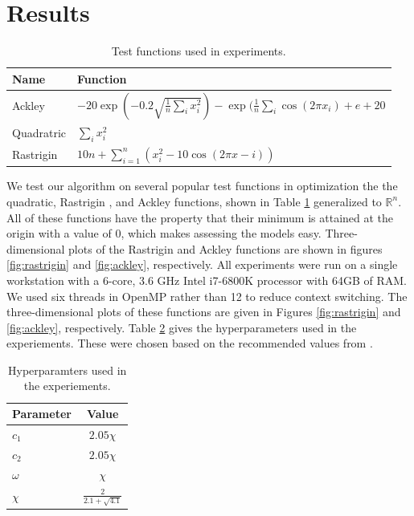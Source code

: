 \section{Results}\label{sec:results}
\begin{table}
  \centering
  \caption{Test functions used in experiments.}\label{tab:functions}
  \begin{tabular}{ll}\toprule
    \textbf{Name} & \textbf{Function}\\\midrule
    Ackley & $-20\exp(-0.2\sqrt{\frac{1}{n}\sum_ix_i^2}) -
             \exp(\frac{1}{n}\sum_i\cos(2\pi x_i) + e + 20$\\
    Quadratric & $\sum_i x_i^2$\\
    Rastrigin & $10n + \sum_{i=1}^n(x_i^2 - 10\cos(2\pi x - i))$\\\bottomrule
  \end{tabular}
\end{table}
We test our algorithm on several popular test functions in optimization
\cite{testprobs} the the quadratic, Rastrigin
\cite{rastrigin}, and Ackley \cite{ackley} functions, shown in Table
\ref{tab:functions} generalized to $\mathbb{R}^n$. All of these functions have
the property that their minimum is attained at the origin with a value of
$0$, which makes assessing the models easy. Three-dimensional plots of the
Rastrigin and Ackley functions are shown in figures \ref{fig:rastrigin} and
\ref{fig:ackley}, respectively.
All experiments were run on a single
workstation with a 6-core, 3.6 GHz Intel i7-6800K processor with 64GB of RAM. We
used six threads in OpenMP rather than 12 to reduce context switching.
The three-dimensional plots of these functions are given in Figures
\ref{fig:rastrigin} and \ref{fig:ackley}, respectively. Table \ref{tab:param}
gives the hyperparameters used in the experiements. These were chosen based on
the recommended values from \cite{spso}.

\begin{table}
  \centering
  \caption{Hyperparamters used in the experiements.}\label{tab:param}
  \begin{tabular}{lc}\toprule
    \textbf{Parameter} & \textbf{Value}\\\midrule
    $c_1$ & $2.05 \chi$\\
    $c_2$ & $2.05 \chi$\\
    $\omega$ & $\chi$\\
    $\chi$ & $\frac{2}{2.1 + \sqrt{4.1}}$\\\bottomrule
    \end{tabular}
\end{table}

